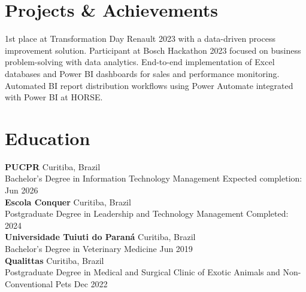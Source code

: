 \documentclass[11pt,a4paper]{article}
\begin{document}
\section{Projects \& Achievements}

1st place at Transformation Day Renault 2023 with a data-driven process improvement solution. Participant at Bosch Hackathon 2023 focused on business problem-solving with data analytics. End-to-end implementation of Excel databases and Power BI dashboards for sales and performance monitoring. Automated BI report distribution workflows using Power Automate integrated with Power BI at HORSE.

\section{Education}

\textbf{PUCPR} \hfill Curitiba, Brazil\\
Bachelor's Degree in Information Technology Management \hfill Expected completion: Jun 2026\\[6pt]

\textbf{Escola Conquer} \hfill Curitiba, Brazil\\
Postgraduate Degree in Leadership and Technology Management \hfill Completed: 2024\\[6pt]

\textbf{Universidade Tuiuti do Paraná} \hfill Curitiba, Brazil\\
Bachelor's Degree in Veterinary Medicine \hfill Jun 2019\\[6pt]

\textbf{Qualittas} \hfill Curitiba, Brazil\\
Postgraduate Degree in Medical and Surgical Clinic of Exotic Animals and Non-Conventional Pets \hfill Dec 2022
\end{document}
